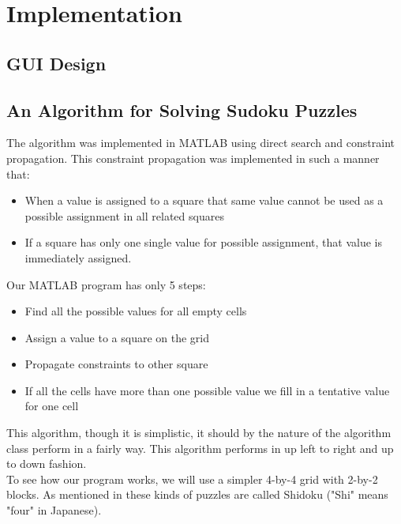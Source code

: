 \documentclass[12pt,a4paper]{article} %
\begin{document}
\section{Implementation}
\subsection{GUI Design}
\subsection{An Algorithm for Solving Sudoku Puzzles}
The algorithm was implemented in MATLAB using direct search and constraint propagation. This constraint propagation was implemented in such a manner that: 
\begin{itemize}
\item When a value is assigned to a square that same value cannot be used as a possible assignment in all related squares
\item If a square has only one single value for possible assignment, that value is immediately assigned.
\end{itemize}
Our MATLAB program has only 5 steps:
\begin{itemize}
\item Find all the possible values for all empty cells
\item Assign a value to a square on the grid
\item Propagate constraints to other square
\item If all the cells have more than one possible value we fill in a tentative value for one cell
\end{itemize}
This algorithm, though it is simplistic, it should by the nature of the algorithm class perform in a fairly way. This algorithm performs in up left to right and up to down fashion.
\newline
\\ To see how our program works, we will use a simpler 4-by-4 grid with 2-by-2 blocks. As mentioned in \cite{crook2009pencil} these kinds of puzzles are called Shidoku ("Shi" means "four" in Japanese). 
\end{document}
